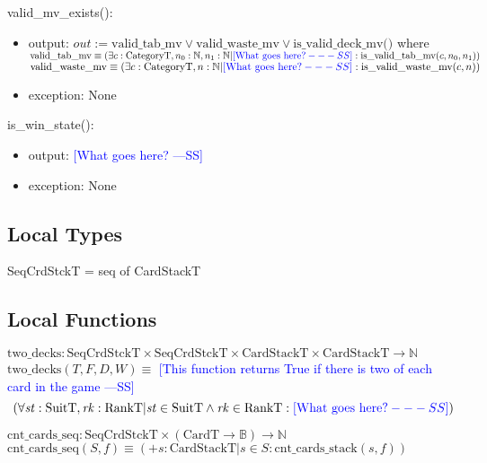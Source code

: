 \documentclass[12pt]{article}
\newcommand{\authornote}[3]{\textcolor{#1}{[#3 ---#2]}}
\newcommand{\authornote}[3]{}
\newcommand{\wss}[1]{\authornote{blue}{SS}{#1}}
\begin{document}
\noindent valid\_mv\_exists():
\begin{itemize}
\item output: $out := \text{valid\_tab\_mv} \vee \text{valid\_waste\_mv} \vee
  \text{is\_valid\_deck\_mv()}$ where\\

  $\text{valid\_tab\_mv} \equiv (\exists c: \text{CategoryT}, n_0: \mathbb{N},
  n_1: \mathbb{N} | \wss{\text{What goes here?}}: \text{is\_valid\_tab\_mv}(c, n_0, n_1))$\\

  $\text{valid\_waste\_mv} \equiv (\exists c: \text{CategoryT}, n: \mathbb{N} |
  \wss{\text{What goes here?}} : \text{is\_valid\_waste\_mv}(c, n))$

\item exception: None

\end{itemize}

\noindent is\_win\_state():
\begin{itemize}
\item output: \wss{What goes here?}
\item exception: None

\end{itemize}

\subsection*{Local Types}

SeqCrdStckT = seq of CardStackT

\subsection*{Local Functions}

\noindent $\text{two\_decks} : \text{SeqCrdStckT} \times \text{SeqCrdStckT}
\times \text{CardStackT} \times \text{CardStackT} \rightarrow \mathbb{N}$\\
\noindent
$\text{two\_decks}(T, F, D, W) \equiv$ \wss{This function returns True if there
  is two of each card in the game}
$$(\forall \mathit{st}: \text{SuitT}, \mathit{rk}:
\text{RankT} | \mathit{st} \in \text{SuitT} \wedge \mathit{rk} \in \text{RankT}
: \wss{\text{What goes here?}})$$

\noindent $\text{cnt\_cards\_seq}: \text{SeqCrdStckT} \times (\text{CardT}
\rightarrow \mathbb{B}) \rightarrow \mathbb{N}$\\
\noindent $\text{cnt\_cards\_seq}(S, f) \equiv (+ s: \text{CardStackT} | s \in S :
\text{cnt\_cards\_stack}(s, f))$\\
\end{document}
